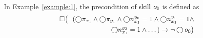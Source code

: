 %
In Example~\ref{example:1}, the precondition of skill $o_{0}$ is defined as
\begin{equation}
\begin{aligned}
\square \big( \neg 
     (
     \bigcirc \pi_{x_1} \land 
     \bigcirc \pi_{y_1} \land
     \bigcirc n_{x_1}^{y_0}=1 \land 
     \bigcirc n_{x_1}^{y_1}=1 \land 
     \\
     \bigcirc n_{x_1}^{y_2}=1 \land 
     \dots)
     \to \neg \bigcirc o_{0} \big)
\end{aligned}
\end{equation}
